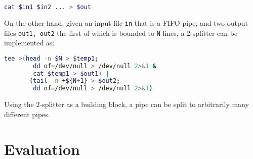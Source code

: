 \documentclass[sigplan,10pt,review,anonymous]{acmart}
\newcommand{\kk}[1]{[{\color{magenta}#1 --- kk}]}
\begin{document}
\begin{lstlisting}[language=sh, float=h, numbers=none]
 cat $in1 $in2 ... > $out
\end{lstlisting}

\noindent
On the other hand, given an input file \verb|in| that is a FIFO pipe,
and two output files \verb|out1, out2| the first of which is bounded
to \verb|N| lines, a 2-splitter can be implemented as:

\begin{lstlisting}[language=sh, float=h, numbers=none]
  tee >(head -n $N > $temp1;
        dd of=/dev/null > /dev/null 2>&1 &
        cat $temp1 > $out1) |
       (tail -n +${N+1} > $out2;
        dd of=/dev/null > /dev/null 2>&1)
\end{lstlisting}

\noindent
Using the 2-splitter as a building block, a pipe can be split to
arbitrarily many different pipes.


\section{Evaluation}
\label{eval}

% 
% 
% 
% 
% 
\end{document}
